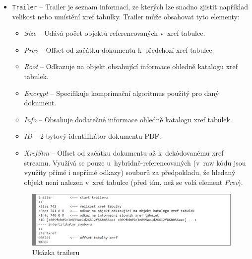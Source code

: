 \begin{itemize}
	\item \verb|Trailer| --  Trailer je seznam informací, ze kterých lze snadno zjistit například velikost nebo umístění xref tabulky. Trailer může obsahovat tyto elementy:
	\begin{itemize}
		\item \textit{Size} -- Udává počet objektů referencovaných v~xref tabulce. 
		\item \textit{Prev} -- Offset od začátku dokumentu k~předchozí xref tabulce.
		\item \textit{Root} -- Odkazuje na objekt obsahující informace ohledně katalogu xref tabulek.
		\item \textit{Encrypt} -- Specifikuje komprimační algoritmus použitý pro daný dokument.
		\item \textit{Info} -- Obsahuje dodatečné informace ohledně katalogu xref tabulek.
		\item \textit{ID} -- 2-bytový identifikátor dokumentu PDF.
		\item \textit{XrefStm} -- Offset od začátku dokumentu až k~dekódovanému xref streamu. Využívá se pouze u~hybridně-referencovaných (v~raw kódu jsou využity přímé i nepřímé odkazy) souborů za předpokladu, že hledaný objekt není nalezen v~xref tabulce (před tím, než se volá element \textit{Prev}). 
	\end{itemize}
	\begin{figure}[h!]
	\centering
	\includegraphics[width=15cm]{img/pdf_trailer}
	\caption{Ukázka traileru}
	\label{fig:pdf_trailer}
	\end{figure}
\end{itemize}
